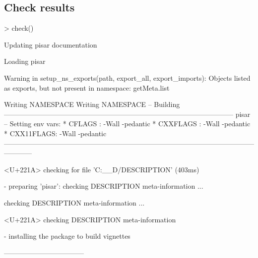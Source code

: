 \documentclass[a4paper,12pt]{article}\usepackage[]{graphicx}\usepackage[]{color}
\begin{document}
\subsection{Check results}
\begin{Schunk}
\begin{Sinput}
> check()
\end{Sinput}
\begin{Soutput}
Updating pisar documentation
\end{Soutput}
\begin{Soutput}
Loading pisar
\end{Soutput}
\begin{Soutput}
Warning in setup_ns_exports(path, export_all, export_imports): Objects listed as exports, but not present in namespace: getMeta.list
\end{Soutput}
\begin{Soutput}
Writing NAMESPACE
Writing NAMESPACE
-- Building --------------------------------------------------------------------------------------------------- pisar --
Setting env vars:
* CFLAGS    : -Wall -pedantic
* CXXFLAGS  : -Wall -pedantic
* CXX11FLAGS: -Wall -pedantic
------------------------------------------------------------------------------------------------------------------------
  
  
  
<U+221A>  checking for file 'C:\__D\OMIKE\pisar/DESCRIPTION' (403ms)

  
  
  
-  preparing 'pisar':
   checking DESCRIPTION meta-information ...
  
   checking DESCRIPTION meta-information ... 
  
<U+221A>  checking DESCRIPTION meta-information

  
  
  
-  installing the package to build vignettes

  
         -----------------------------------


\end{Soutput}
\end{Schunk}
\end{document}
